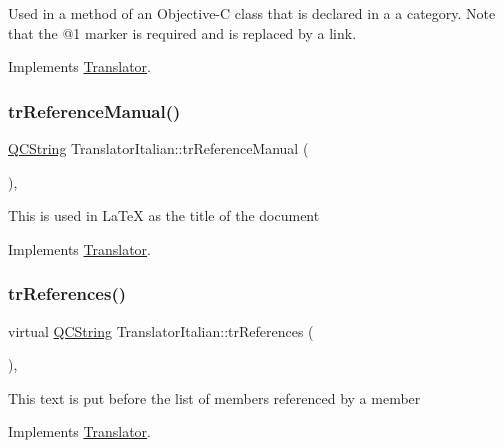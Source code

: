 Used in a method of an Objective-\/C class that is declared in a a category. Note that the @1 marker is required and is replaced by a link. 

Implements \mbox{\hyperlink{class_translator}{Translator}}.

\mbox{\label{class_translator_italian_aea988204498931a93fec179446d44322}} 
\subsubsection{\texorpdfstring{trReferenceManual()}{trReferenceManual()}}
{\footnotesize\ttfamily \mbox{\hyperlink{class_q_c_string}{Q\+C\+String}} Translator\+Italian\+::tr\+Reference\+Manual (\begin{DoxyParamCaption}{ }\end{DoxyParamCaption})\hspace{0.3cm}{\ttfamily [inline]}, {\ttfamily [virtual]}}

This is used in La\+TeX as the title of the document 

Implements \mbox{\hyperlink{class_translator}{Translator}}.

\mbox{\label{class_translator_italian_ae159279b6836f25e640ee0c8f4f8146b}} 
\subsubsection{\texorpdfstring{trReferences()}{trReferences()}}
{\footnotesize\ttfamily virtual \mbox{\hyperlink{class_q_c_string}{Q\+C\+String}} Translator\+Italian\+::tr\+References (\begin{DoxyParamCaption}{ }\end{DoxyParamCaption})\hspace{0.3cm}{\ttfamily [inline]}, {\ttfamily [virtual]}}

This text is put before the list of members referenced by a member 

Implements \mbox{\hyperlink{class_translator}{Translator}}.

\mbox{\label{class_translator_italian_a68bc1a8613ef23dbafb9a222830d942b}} 
